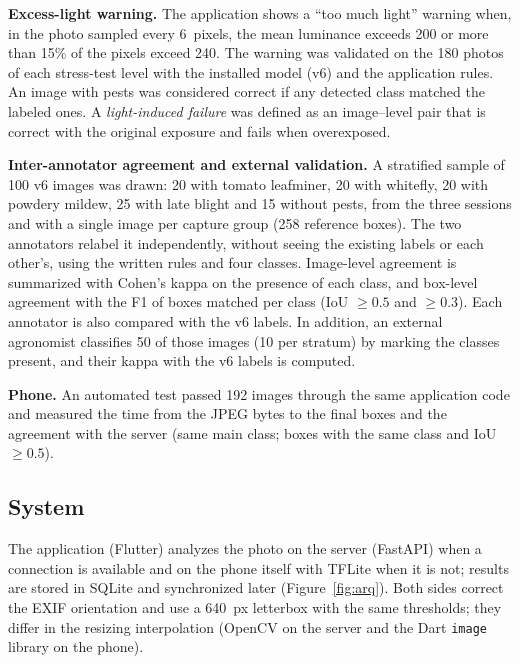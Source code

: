 \documentclass[sensors,article,submit,pdftex,moreauthors]{Definitions/mdpi}
\begin{document}
\textbf{Excess-light warning.} The application shows a ``too much light'' warning when, in the photo sampled every 6~pixels, the mean luminance exceeds 200 or more than 15\% of the pixels exceed 240. The warning was validated on the 180 photos of each stress-test level with the installed model (v6) and the application rules. An image with pests was considered correct if any detected class matched the labeled ones. A \emph{light-induced failure} was defined as an image--level pair that is correct with the original exposure and fails when overexposed.

\textbf{Inter-annotator agreement and external validation.}\label{sec:acuerdo} A stratified sample of 100 v6 images was drawn: 20 with tomato leafminer, 20 with whitefly, 20 with powdery mildew, 25 with late blight and 15 without pests, from the three sessions and with a single image per capture group (258 reference boxes). The two annotators relabel it independently, without seeing the existing labels or each other's, using the written rules and four classes. Image-level agreement is summarized with Cohen's kappa on the presence of each class, and box-level agreement with the F1 of boxes matched per class (IoU $\geq 0.5$ and $\geq 0.3$). Each annotator is also compared with the v6 labels. In addition, an external agronomist classifies 50 of those images (10 per stratum) by marking the classes present, and their kappa with the v6 labels is computed.

\textbf{Phone.} An automated test passed 192 images through the same application code and measured the time from the JPEG bytes to the final boxes and the agreement with the server (same main class; boxes with the same class and IoU $\geq 0.5$).

\subsection{System}

The application (Flutter) analyzes the photo on the server (FastAPI) when a connection is available and on the phone itself with TFLite when it is not; results are stored in SQLite and synchronized later (Figure~\ref{fig:arq}). Both sides correct the EXIF orientation and use a 640~px letterbox with the same thresholds; they differ in the resizing interpolation (OpenCV on the server and the Dart \texttt{image} library on the phone).
\end{document}
